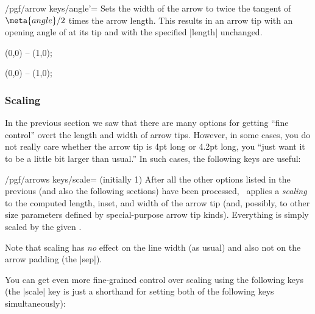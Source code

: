 \begin{key}{/pgf/arrow keys/angle'=}
  Sets the width of the arrow to twice the tangent of $\meta{angle}/2$
  times the arrow length. This results in an arrow tip with an opening
  angle of  at its tip and with the specified |length|
  unchanged. 
\begin{codeexample}[]
\tikz \draw [arrows = {-Stealth[inset=0pt, length=10pt, angle'=90]}]
            (0,0) -- (1,0);
\end{codeexample}
\begin{codeexample}[]
\tikz \draw [arrows = {-Stealth[inset=0pt, length=10pt, angle'=30]}]
            (0,0) -- (1,0);
\end{codeexample}
\end{key}


\subsubsection{Scaling}

In the previous section we saw that there are many options for getting
``fine control'' overt the length and width of arrow tips. However, in
some cases, you do not really care whether the arrow tip is 4pt long
or 4.2pt long, you ``just want it to be a little bit larger than
usual.'' In such cases, the following keys are useful:

\begin{key}{/pgf/arrows keys/scale= (initially 1)}
  After all the other options listed in the previous (and also the
  following sections) have been processed, \tikzname\ applies a
  \emph{scaling} to the computed length, inset, and width of the arrow
  tip (and, possibly, to other size parameters defined by
  special-purpose arrow tip kinds). Everything is simply scaled by the
  given .
\begin{codeexample}[]
\end{codeexample}  
  Note that scaling has \emph{no} effect on the line width (as usual)
  and also not on the arrow padding (the |sep|).
\end{key}

You can get even more fine-grained control over scaling using the
following keys (the |scale| key is just a shorthand for setting both
of the following keys simultaneously):


